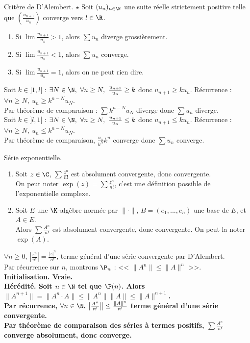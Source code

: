 \documentclass[11pt]{article}
\begin{document}
\begin{prop}{Critère de D'Alembert. $\star$}{}
    Soit $(u_n)_{n\in\N}$ une suite réelle strictement positive telle que $\left(\frac{u_{n+1}}{u_n}\right)$ converge vers $l\in\R$.
    \begin{enumerate}
        \item Si $\lim\frac{u_{n+1}}{u_n}>1$, alors $\sum u_n$ diverge grossièrement.
        \item Si $\lim\frac{u_{n+1}}{u_n}<1$, alors $\sum u_n$ converge.
        \item Si $\lim\frac{u_{n+1}}{u_n}=1$, alors on ne peut rien dire.
    \end{enumerate}
    \tcblower
     Soit $k\in]1,l[$ : $\exists N \in \N, ~ \forall n \geq N, ~ \frac{u_{n+1}}{u_n} \geq k$ donc $u_{n+1}\geq ku_n$. Récurrence : $\forall n \geq N, ~ u_n \geq k^{n-N}u_N$.\\
    Par théorème de comparaison : $\sum k^{n-N}u_N$ diverge donc $\sum u_n$ diverge.\\
     Soit $k\in]l,1[$ : $\exists N \in \N, ~ \forall n \geq N, ~ \frac{u_{n+1}}{u_n}\leq k$ donc $u_{n+1}\leq ku_n$. Récurrence : $\forall n \geq N, ~ u_n \leq k^{n-N}u_N$.\\
    Par théorème de comparaison, $\frac{u_n}{k^N}k^n$ converge donc $\sum u_n$ converge.
\end{prop}

\begin{prop}{Série exponentielle.}{}
    \begin{enumerate}
        \item Soit $z\in\C$, $\sum\frac{z^n}{n!}$ est absolument convergente, donc convergente.\\
        On peut noter $\exp(z)=\sum\frac{z^n}{n!}$, c'est une définition possible de l'exponentielle complexe.
        \item Soit $E$ une $\K$-algèbre normée par $\|\cdot\|$, $B=(e_1,...,e_n)$ une base de $E$, et $A\in E$.\\
            Alors $\sum\frac{A^n}{n!}$ est absolument convergente, donc convergente. On peut la noter $\exp(A)$.
    \end{enumerate}
    \tcblower
     $\forall n \geq 0, ~ \left|\frac{z^n}{n!}\right| = \frac{|z|^n}{n!}$, terme général d'une série convergente par D'Alembert.\\
     Par récurrence sur $n$, montrons $\P_n$ : << $\|A^n\|\leq\|A\|^n$ >>.\\
    \bf{Initialisation.} Vraie.\\
    \bf{Hérédité.} Soit $n\in\N$ tel que $\P(n)$. Alors $\|A^{n+1}\|=\|A^n\cdot A\|\leq\|A^n\|\|A\|\leq \|A\|^{n+1}$.\\
    Par récurrence, $\forall n \in \N, \left\|\frac{A^n}{n!}\right\| \leq \frac{\|A\|^n}{n!}$ terme général d'une série convergente.\\
    Par théorème de comparaison des séries à \bf{termes positifs}, $\sum\frac{A^n}{n!}$ converge absolument, donc converge.
\end{prop}
\end{document}
